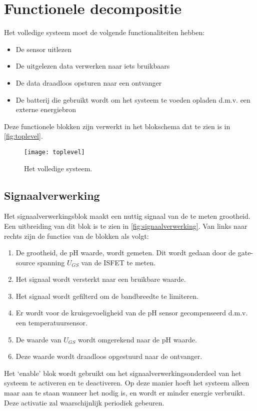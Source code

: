 \section{Functionele decompositie}
Het volledige systeem moet de volgende functionaliteiten hebben:

\begin{itemize}
    \item De sensor uitlezen
    \item De uitgelezen data verwerken naar iets bruikbaars
    \item De data draadloos opsturen naar een ontvanger
    \item De batterij die gebruikt wordt om het systeem te voeden opladen d.m.v. een externe energiebron
\end{itemize}
Deze functionele blokken zijn verwerkt in het blokschema dat te zien is in \autoref{fig:toplevel}.

\begin{figure}[ht]
    \centering
    \texttt{[image: toplevel]}
    \caption{Het volledige systeem.}
    \label{fig:toplevel}
\end{figure}

\subsection{Signaalverwerking}
Het signaalverwerkingsblok maakt een nuttig signaal van de te meten grootheid. Een uitbreiding van dit blok is te zien in \autoref{fig:signaalverwerking}.
Van links naar rechts zijn de functies van de blokken als volgt:
\begin{enumerate}
    \item De grootheid, de pH waarde, wordt gemeten. Dit wordt gedaan door de gate-source spanning $U_{GS}$ van de ISFET te meten.
    \item Het signaal wordt versterkt naar een bruikbare waarde.
    \item Het signaal wordt gefilterd om de bandbreedte te limiteren.
    \item Er wordt voor de kruisgevoeligheid van de pH sensor gecompenseerd d.m.v. een temperatuursensor.
    \item De waarde van $U_{GS}$ wordt omgerekend naar de pH waarde.
    \item Deze waarde wordt draadloos opgestuurd naar de ontvanger.
\end{enumerate}
Het `enable' blok wordt gebruikt om het signaalverwerkingsonderdeel van het systeem te activeren en te deactiveren. Op deze manier hoeft het systeem alleen maar aan te staan wanneer het nodig is, en wordt er minder energie verbruikt. Deze activatie zal waarschijnlijk periodiek gebeuren.

